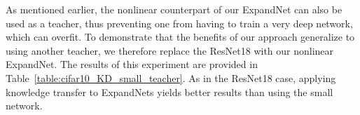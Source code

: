 \documentclass[10pt,twocolumn,letterpaper]{article}
\begin{document}
\begin{table}[t]
    \centering
    \vspace{0.02cm}
    \caption{{\bf Knowledge transfer from the nonlinear ExpandNet on CIFAR-10.} As in the ResNet18 case, transferring to ExpandNets is more effective than to the small network. 
    }
    \label{table:cifar10_KD_small_teacher}
\end{table}
As mentioned earlier, the nonlinear counterpart of our ExpandNet can also be used as a teacher, thus preventing one from having to train a very deep network, which can overfit. To demonstrate that the benefits of our approach generalize to using another teacher, we therefore replace the ResNet18 with our nonlinear ExpandNet. The results of this experiment are provided in Table~\ref{table:cifar10_KD_small_teacher}. As in the ResNet18 case, applying knowledge transfer to ExpandNets yields better results than using the small network. 
\end{document}
